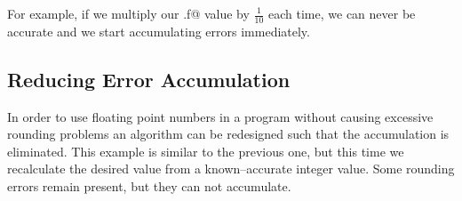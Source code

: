 For example, if we multiply our \verb@x.f@ value by $\frac{1}{10}$ each time, 
we can never be accurate and we start accumulating errors immediately.


\subsection{Reducing Error Accumulation} 
In order to use floating point numbers in a program without causing 
excessive rounding problems an algorithm can be redesigned such that the 
accumulation is eliminated.  
This example is similar to the previous one, but this time we recalculate the 
desired value from a known--accurate integer value.  
Some rounding errors remain present, but they can not accumulate.

